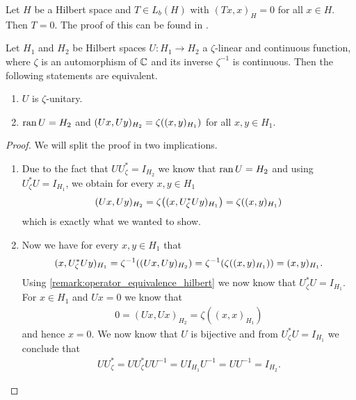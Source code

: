 \begin{remark}\label{remark:operator_equivalence_hilbert}
		Let $H$ be a Hilbert space and $T\in L_b(H)$ with $(Tx,x)_H = 0$ for all $x \in H$. Then $T = 0$. The proof of this can be found in \cite[p.142]{FAna1}.
\end{remark}


\begin{proposition}
	Let $H_1$ and $H_2$ be Hilbert spaces $U: H_1 \to H_2$ a $\zeta$-linear and continuous function, where $\zeta$ is an automorphism of $\mathbb{C}$ and its inverse $\zeta^{-1}$ is continuous. Then the following statements are equivalent.
	\begin{enumerate}[label = (\roman*)]
		\item $U$ is $\zeta$-unitary. 
		\item $\operatorname{ran} U = H_2$ and $(Ux , Uy)_{H_2} = \zeta{\left ( (x,y)_{H_1} \right )}$ for all $x,y \in H_1$.
	\end{enumerate}
\end{proposition}

\begin{proof}
	We will split the proof in two implications.
	\begin{enumerate}
		\item[\Quote{$(\mathrm{i}) \Rightarrow \ (\mathrm{ii})$}] Due to the fact that $U U_\zeta^\ast = I_{H_2}$ we know that $\operatorname{ran} U = H_2$ and using $U_\zeta^\ast U = I_{H_1}$, we obtain for every $x,y \in H_1$ 
		\begin{align*}
			(Ux, Uy)_{H_2} = \zeta{\left ( (x, U_\zeta^\ast U y)_{H_1} \right )} = \zeta {\left ( (x,y)_{H_1} \right )}
		\end{align*}
		which is exactly what we wanted to show.
		
		\item[\Quote{$(\mathrm{ii}) \Rightarrow \ (\mathrm{i})$}] Now we have for every $x,y \in H_1$ that 
		\begin{align*}
			(x, U_\zeta^\ast U y)_{H_1} = \zeta^{-1}{\left ( (Ux, Uy)_{H_2} \right )} = \zeta^{-1}{\left ( \zeta{\left ( (x,y)_{H_1} \right )} \right )} = (x,y)_{H_1}.
		\end{align*}
		Using \ref{remark:operator_equivalence_hilbert} we now know that $U_\zeta^\ast U = I_{H_1}$. For $x \in H_1$ and $Ux = 0$ we know that
		\begin{align*}
			0 = (Ux, Ux)_{H_2} = \zeta((x,x)_{H_1})
		\end{align*}
		and hence $x = 0$. We now know that $U$ is bijective and from $U_\zeta^\ast U = I_{H_1}$ we conclude that
		\begin{align*}
			U U_\zeta^\ast = U U_\zeta^\ast UU^{-1} = UI_{H_1}U^{-1} = UU^{-1} = I_{H_2}.
		\end{align*}
	\end{enumerate}
\end{proof}


